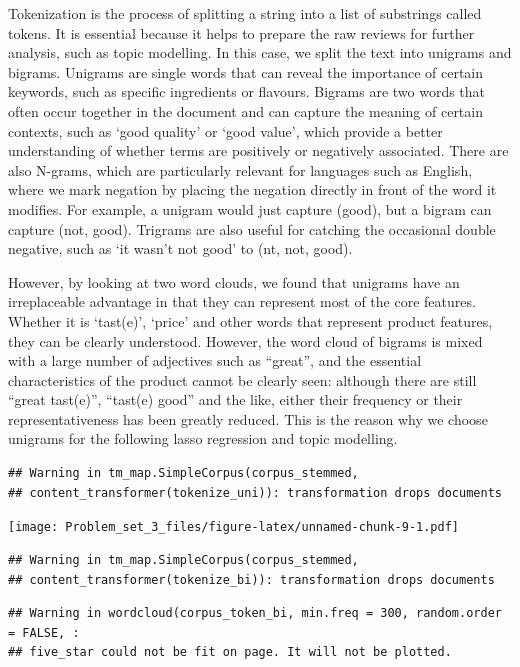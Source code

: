 \documentclass[
]{article}
\begin{document}
Tokenization is the process of splitting a string into a list of
substrings called tokens. It is essential because it helps to prepare
the raw reviews for further analysis, such as topic modelling. In this
case, we split the text into unigrams and bigrams. Unigrams are single
words that can reveal the importance of certain keywords, such as
specific ingredients or flavours. Bigrams are two words that often occur
together in the document and can capture the meaning of certain
contexts, such as `good quality' or `good value', which provide a better
understanding of whether terms are positively or negatively associated.
There are also N-grams, which are particularly relevant for languages
such as English, where we mark negation by placing the negation directly
in front of the word it modifies. For example, a unigram would just
capture (good), but a bigram can capture (not, good). Trigrams are also
useful for catching the occasional double negative, such as `it wasn't
not good' to (nt, not, good).

However, by looking at two word clouds, we found that unigrams have an
irreplaceable advantage in that they can represent most of the core
features. Whether it is `tast(e)', `price' and other words that
represent product features, they can be clearly understood. However, the
word cloud of bigrams is mixed with a large number of adjectives such as
``great'', and the essential characteristics of the product cannot be
clearly seen: although there are still ``great tast(e)'', ``tast(e)
good'' and the like, either their frequency or their representativeness
has been greatly reduced. This is the reason why we choose unigrams for
the following lasso regression and topic modelling.

\begin{verbatim}
## Warning in tm_map.SimpleCorpus(corpus_stemmed,
## content_transformer(tokenize_uni)): transformation drops documents
\end{verbatim}

\texttt{[image: Problem\_set\_3\_files/figure-latex/unnamed-chunk-9-1.pdf]}

\begin{verbatim}
## Warning in tm_map.SimpleCorpus(corpus_stemmed,
## content_transformer(tokenize_bi)): transformation drops documents
\end{verbatim}

\begin{verbatim}
## Warning in wordcloud(corpus_token_bi, min.freq = 300, random.order = FALSE, :
## five_star could not be fit on page. It will not be plotted.
\end{verbatim}
\end{document}
